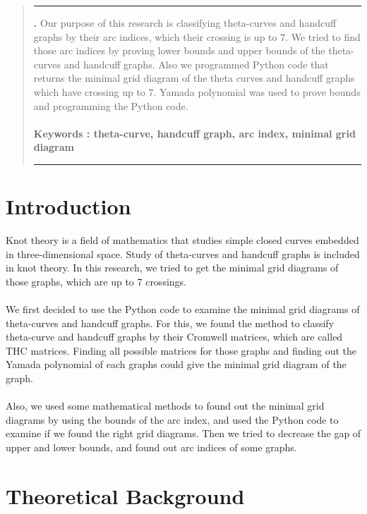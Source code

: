 \documentclass{article}
\theoremstyle{definition}
\theoremstyle{theorem}
\theoremstyle{proposition}
\theoremstyle{corollary}
\begin{document}
\renewenvironment{abstract}
{\begin{quote}
\noindent \rule{\linewidth}{.5pt}\par{\bfseries \abstractname.}}
{\medskip\noindent \rule{\linewidth}{.5pt}
\end{quote}
}

\begin{abstract}
Our purpose of this research is classifying theta-curves and handcuff graphs by their arc indices, which their crossing is up to 7.
We tried to find those arc indices by proving lower bounds and upper bounds of the theta-curves and handcuff graphs.
Also we programmed Python code that returns the minimal grid diagram of the theta curves and handcuff graphs which have crossing up to 7.
Yamada polynomial was used to prove bounds and programming the Python code.\\ \\
\textbf{Keywords : theta-curve, handcuff graph, arc index, minimal grid diagram}
\\
\end{abstract}

\newpage
\section{Introduction}
Knot theory is a field of mathematics that studies simple closed curves embedded in three-dimensional space. Study of theta-curves and handcuff graphs is included in knot theory. In this research, we tried to get the minimal grid diagrams of those graphs, which are up to 7 crossings.\\ \\
We first decided to use the Python code to examine the minimal grid diagrams of theta-curves and handcuff graphs. For this, we found the method to classify theta-curve and handcuff graphs by their Cromwell matrices, which are called THC matrices. Finding all possible matrices for those graphs and finding out the Yamada polynomial of each graphs could give the minimal grid diagram of the graph. \\ \\
Also, we used some mathematical methods to found out the minimal grid diagrams by using the bounds of the arc index, and used the Python code to examine if we found the right grid diagrams. Then we tried to decrease the gap of upper and lower bounds, and found out arc indices of some graphs.

\section{Theoretical Background}
\end{document}
